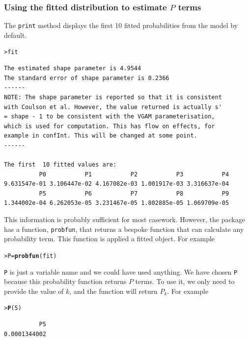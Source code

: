 \documentclass{article}\usepackage[]{graphicx}\usepackage[]{xcolor}
\makeatletter
\newcommand{\hlnum}[1]{\textcolor[rgb]{0.686,0.059,0.569}{#1}}%
\newcommand{\hlstd}[1]{\textcolor[rgb]{0.345,0.345,0.345}{#1}}%
\newcommand{\hlkwb}[1]{\textcolor[rgb]{0.69,0.353,0.396}{#1}}%
\newcommand{\hlkwd}[1]{\textcolor[rgb]{0.737,0.353,0.396}{\textbf{#1}}}%
\newenvironment{kframe}{%
 \def\at@end@of@kframe{}%
 \ifinner\ifhmode%
  \def\at@end@of@kframe{\end{minipage}}%
  \begin{minipage}{\columnwidth}%
 \fi\fi%
 \def\FrameCommand##1{\hskip\@totalleftmargin \hskip-\fboxsep
 \colorbox{shadecolor}{##1}\hskip-\fboxsep
     \hskip-\linewidth \hskip-\@totalleftmargin \hskip\columnwidth}%
 \MakeFramed {\advance\hsize-\width
   \@totalleftmargin\z@ \linewidth\hsize
   \@setminipage}}%
 {\par\unskip\endMakeFramed%
 \at@end@of@kframe}
\newenvironment{knitrout}{}{} %
\newcommand{\rcode}[1]{\lstinline[language=R,basicstyle=\normalsize\ttfamily]!#1!}
\makeatother
\begin{document}
\subsubsection{Using the fitted distribution to estimate $P$ terms}
The \rcode{print} method displays the first 10 fitted probabilities from the model by default.
\begin{knitrout}
\color{fgcolor}\begin{kframe}
\begin{alltt}
\hlstd{> }\hlstd{fit}
\end{alltt}
\begin{verbatim}
The estimated shape parameter is 4.9544 
The standard error of shape parameter is 0.2366 
------
NOTE: The shape parameter is reported so that it is consistent
with Coulson et al. However, the value returned is actually s'
= shape - 1 to be consistent with the VGAM parameterisation,
which is used for computation. This has flow on effects, for
example in confInt. This will be changed at some point.
------

The first  10 fitted values are:
          P0           P1           P2           P3           P4 
9.631547e-01 3.106447e-02 4.167082e-03 1.001917e-03 3.316637e-04 
          P5           P6           P7           P8           P9 
1.344002e-04 6.262053e-05 3.231467e-05 1.802885e-05 1.069709e-05 
\end{verbatim}
\end{kframe}
\end{knitrout}\noindent
This information is probably sufficient for most casework. However, the package has a function, \rcode{probfun}, that returns a bespoke function that can calculate any probability term. This function is applied a fitted object. For example
\begin{knitrout}
\color{fgcolor}\begin{kframe}
\begin{alltt}
\hlstd{> }\hlstd{P} \hlkwb{=} \hlkwd{probfun}\hlstd{(fit)}
\end{alltt}
\end{kframe}
\end{knitrout}\noindent
\rcode{P} is just a variable name and we could have used anything. We have chosen \rcode{P} because this probability function returns $P$ terms. To use it, we only need to provide the value of $k$, and the function will return $P_k$. For example
\begin{knitrout}
\color{fgcolor}\begin{kframe}
\begin{alltt}
\hlstd{> }\hlkwd{P}\hlstd{(}\hlnum{5}\hlstd{)}
\end{alltt}
\begin{verbatim}
          P5 
0.0001344002 
\end{verbatim}
\end{kframe}
\end{knitrout}\noindent
\end{document}
